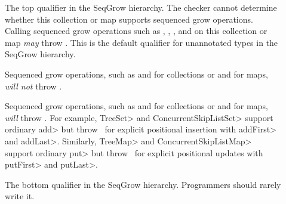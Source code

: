 \begin{description}
\item[]
The top qualifier in the SeqGrow hierarchy.
The checker cannot determine whether this collection or map supports sequenced grow
operations.
Calling sequenced grow operations such as , ,
, and  on this collection or map \emph{may}
throw \UnsupportedOperationException.
This is the default qualifier for unannotated types in the
SeqGrow hierarchy.

\item[]
Sequenced grow operations, such as  and  for
collections or  and  for maps, \emph{will not}
throw \UnsupportedOperationException.

\item[]
Sequenced grow operations, such as  and  for
collections or  and  for maps, \emph{will}
throw \UnsupportedOperationException.
For example, \<TreeSet> and \<ConcurrentSkipListSet> support ordinary
\<add> but throw \UnsupportedOperationException\ for explicit positional
insertion with \<addFirst> and \<addLast>.
Similarly, \<TreeMap> and \<ConcurrentSkipListMap> support ordinary \<put>
but throw \UnsupportedOperationException\ for explicit positional updates
with \<putFirst> and \<putLast>.

\item[]
The bottom qualifier in the SeqGrow hierarchy.  Programmers should rarely write it.
\end{description}


